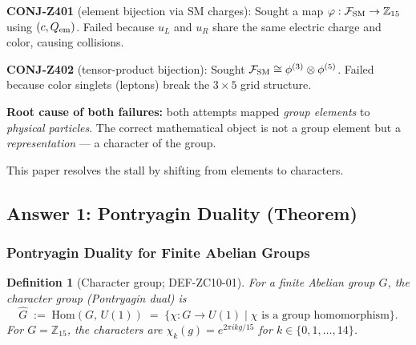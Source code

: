 \documentclass[12pt, a4paper]{article}
\newtheorem{definition}{Definition}[section]
\begin{document}
\begin{formalbox}[title={The two failed bijections of TASK-ZC09}]
\textbf{CONJ-Z401} (element bijection via SM charges):
Sought a map $\varphi: \mathcal{F}_{\rm SM} \to \mathbb{Z}_{15}$
using $(c, Q_{\rm em})$. Failed because $u_L$ and $u_R$ share the
same electric charge and color, causing collisions.

\textbf{CONJ-Z402} (tensor-product bijection):
Sought $\mathcal{F}_{\rm SM} \cong \phi^{(3)} \otimes \phi^{(5)}$.
Failed because color singlets (leptons) break the $3\times 5$ grid
structure.

\textbf{Root cause of both failures:} both attempts mapped
\emph{group elements} to \emph{physical particles}.
The correct mathematical object is not a group element but a
\emph{representation} --- a character of the group.
\end{formalbox}

This paper resolves the stall by shifting from elements to characters.

\subsection{Answer 1: Pontryagin Duality (Theorem)}
\label{sec:pontryagin}

\subsubsection{Pontryagin Duality for Finite Abelian Groups}

\begin{definition}[Character group; DEF-ZC10-01]
\label{def:character}
For a finite Abelian group $G$, the \emph{character group}
(Pontryagin dual) is
\begin{equation}
  \hat{G} \;:=\; \mathrm{Hom}(G,\, U(1))
  \;=\; \{\chi: G \to U(1) \mid \chi \text{ is a group homomorphism}\}.
  \label{eq:pontryagin-def}
\end{equation}
For $G = \mathbb{Z}_{15}$, the characters are
$\chi_k(g) = e^{2\pi i k g / 15}$ for $k \in \{0, 1, \ldots, 14\}$.
\end{definition}
\end{document}
